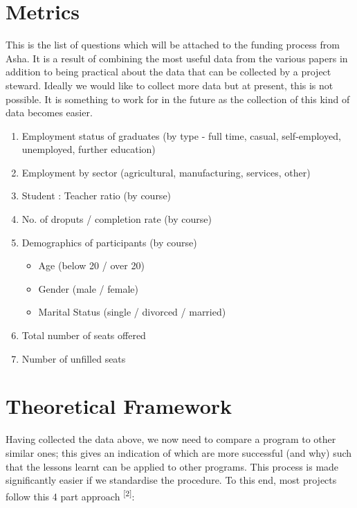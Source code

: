 \documentclass[a4paper, 10pt]{article}
\begin{document}
\section*{Metrics}
This is the list of questions which will be attached to the funding process from Asha. It is a result of combining the most useful data from the various papers in addition to being practical about the data that can be collected by a project steward. Ideally we would like to collect more data but at present, this is not possible. It is something to work for in the future as the collection of this kind of data becomes easier. 

\begin{enumerate}

\item Employment status of graduates (by type - full time, casual, self-employed, unemployed, further education)

\item Employment by sector (agricultural, manufacturing, services, other)

\item Student : Teacher ratio (by course)

\item No. of droputs / completion rate (by course)

\item Demographics of participants (by course)
	\begin{itemize}
	\item Age (below 20 / over 20)
	\item Gender (male / female)
	\item Marital Status (single / divorced / married)
	\end{itemize}

\item Total number of seats offered

\item Number of unfilled seats

\end{enumerate}

\section*{Theoretical Framework}

Having collected the data above, we now need to compare a program to other similar ones; this gives an indication of which are more successful (and why) such that the lessons learnt can be applied to other programs. This process is made significantly easier if we standardise the procedure. To this end, most projects follow this 4 part approach \textsuperscript{[2]}:
\end{document}

